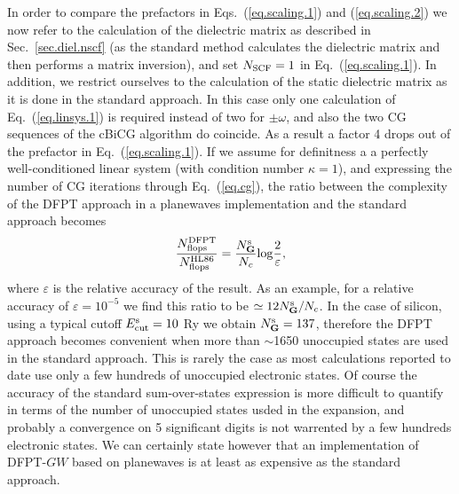 \documentclass[twocolumn,prb,showpacs,superscriptaddress]{revtex4}
\def\w{\omega}
\def\G{{\bf G}}
\begin{document}
In order to compare the prefactors in Eqs.\ (\ref{eq.scaling.1}) and (\ref{eq.scaling.2})
we now refer to the calculation of the dielectric matrix as described in Sec.\ \ref{sec.diel.nscf}
(as the standard method calculates the dielectric matrix and then performs a matrix inversion),
and set $N_{\rm SCF}=1$ in Eq.\ (\ref{eq.scaling.1}). In addition, we restrict ourselves to
the calculation of the static dielectric matrix as it is done in the standard approach.
In this case only one calculation of Eq.\ (\ref{eq.linsys.1}) is required instead of two for $\pm\w$, 
and also the two CG sequences of the cBiCG algorithm do coincide.
As a result a factor 4 drops out of the prefactor in Eq.\ (\ref{eq.scaling.1}).
If we assume for definitness a a perfectly well-conditioned linear system (with condition number $\kappa=1$),
and expressing the number of CG iterations through Eq.\ (\ref{eq.cg}),
the ratio between the complexity of the DFPT approach in a planewaves
implementation and the standard approach becomes
   \begin{equation}\label{eq.ratio.flops}
   \frac{N^{\rm DFPT}_{\rm flops}}{N^{\rm HL86}_{\rm flops}} = \frac{N_\G^{\rm s}}{N_c} {\rm log}\frac{2}{\varepsilon},
   \end{equation}
where $\varepsilon$ is the relative accuracy of the result.
As an example, for a relative accuracy of $\varepsilon=10^{-5}$ 
we find this ratio to be $\simeq 12 N_\G^{\rm s}/N_c$.
In the case of silicon, using a typical cutoff $E_{\rm cut}^{\rm s}=10$ Ry we obtain $N_\G^{\rm s}=137$, therefore
the DFPT approach becomes convenient when more than $\sim$1650 unoccupied states are used
in the standard approach.
This is rarely the case as most calculations reported to date use only a few hundreds of 
unoccupied electronic states.
Of course the accuracy of the standard sum-over-states expression is more difficult to
quantify in terms of the number of unoccupied states usded in the expansion, and probably
a convergence on 5 significant digits is not warrented by a few
hundreds electronic states. We can certainly state however that an implementation of DFPT-$GW$ 
based on planewaves is at least as expensive as the standard approach.
\end{document}

